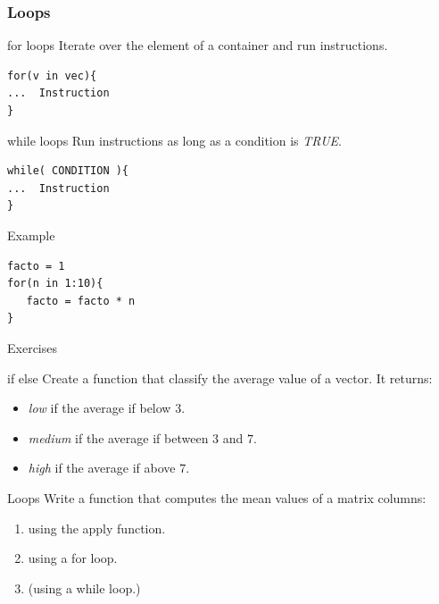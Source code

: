 \documentclass[10pt]{beamer}
\newenvironment{xframe}[2][]
  {\begin{frame}[fragile,environment=xframe,#1]
  \frametitle{#2}}
  {\end{frame}}
\begin{document}
\begin{xframe}{Loops}
  \begin{block}{{\sf for} loops}
    Iterate over the element of a container and run instructions.
\begin{verbatim}
for(v in vec){
...  Instruction
}
\end{verbatim}  
  \end{block}
  \begin{block}{{\sf while} loops}
    Run instructions as long as a condition is {\it TRUE}.
\begin{verbatim}
while( CONDITION ){
...  Instruction
}
\end{verbatim}  
  \end{block}
  \begin{exampleblock}{Example}
\begin{verbatim}
facto = 1
for(n in 1:10){
   facto = facto * n
}
\end{verbatim}  
  \end{exampleblock}
\end{xframe}


\begin{frame}{Exercises}
  \begin{block}{{\sf if else}}
    Create a function that classify the average value of a {\sf vector}. It returns:
    \begin{itemize}
    \item {\it low} if the average if below $3$.
    \item {\it medium} if the average if between $3$ and $7$.
    \item {\it high} if the average if above $7$.
    \end{itemize}
  \end{block}
  
  \bigskip
  
  \begin{block}{Loops}
    Write a function that computes the mean values of a matrix columns:
    \begin{enumerate}
    \item using the {\sf apply}  function.
    \item using a {\sf for} loop.
    \item (using a {\sf while} loop.)
    \end{enumerate}
  \end{block}
\end{frame}
\end{document}

